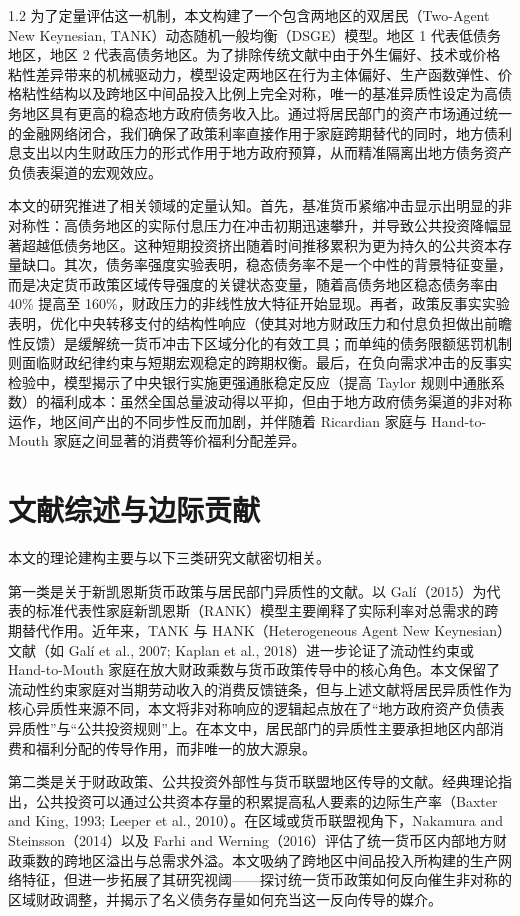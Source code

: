 \documentclass[12pt,UTF8]{ctexart}
\begin{document}
\begin{spacing}{1.2}
		为了定量评估这一机制，本文构建了一个包含两地区的双居民（Two-Agent New Keynesian, TANK）动态随机一般均衡（DSGE）模型。地区 1 代表低债务地区，地区 2 代表高债务地区。为了排除传统文献中由于外生偏好、技术或价格粘性差异带来的机械驱动力，模型设定两地区在行为主体偏好、生产函数弹性、价格粘性结构以及跨地区中间品投入比例上完全对称，唯一的基准异质性设定为高债务地区具有更高的稳态地方政府债务收入比。通过将居民部门的资产市场通过统一的金融网络闭合，我们确保了政策利率直接作用于家庭跨期替代的同时，地方债利息支出以内生财政压力的形式作用于地方政府预算，从而精准隔离出地方债务资产负债表渠道的宏观效应。
		
		本文的研究推进了相关领域的定量认知。首先，基准货币紧缩冲击显示出明显的非对称性：高债务地区的实际付息压力在冲击初期迅速攀升，并导致公共投资降幅显著超越低债务地区。这种短期投资挤出随着时间推移累积为更为持久的公共资本存量缺口。其次，债务率强度实验表明，稳态债务率不是一个中性的背景特征变量，而是决定货币政策区域传导强度的关键状态变量，随着高债务地区稳态债务率由 40\% 提高至 160\%，财政压力的非线性放大特征开始显现。再者，政策反事实实验表明，优化中央转移支付的结构性响应（使其对地方财政压力和付息负担做出前瞻性反馈）是缓解统一货币冲击下区域分化的有效工具；而单纯的债务限额惩罚机制则面临财政纪律约束与短期宏观稳定的跨期权衡。最后，在负向需求冲击的反事实检验中，模型揭示了中央银行实施更强通胀稳定反应（提高 Taylor 规则中通胀系数）的福利成本：虽然全国总量波动得以平抑，但由于地方政府债务渠道的非对称运作，地区间产出的不同步性反而加剧，并伴随着 Ricardian 家庭与 Hand-to-Mouth 家庭之间显著的消费等价福利分配差异。
		
		\section{文献综述与边际贡献}
		
		本文的理论建构主要与以下三类研究文献密切相关。
		
		第一类是关于新凯恩斯货币政策与居民部门异质性的文献。以 Galí（2015）为代表的标准代表性家庭新凯恩斯（RANK）模型主要阐释了实际利率对总需求的跨期替代作用。近年来，TANK 与 HANK（Heterogeneous Agent New Keynesian）文献（如 Galí et al., 2007; Kaplan et al., 2018）进一步论证了流动性约束或 Hand-to-Mouth 家庭在放大财政乘数与货币政策传导中的核心角色。本文保留了流动性约束家庭对当期劳动收入的消费反馈链条，但与上述文献将居民异质性作为核心异质性来源不同，本文将非对称响应的逻辑起点放在了“地方政府资产负债表异质性”与“公共投资规则”上。在本文中，居民部门的异质性主要承担地区内部消费和福利分配的传导作用，而非唯一的放大源泉。
		
		第二类是关于财政政策、公共投资外部性与货币联盟地区传导的文献。经典理论指出，公共投资可以通过公共资本存量的积累提高私人要素的边际生产率（Baxter and King, 1993; Leeper et al., 2010）。在区域或货币联盟视角下，Nakamura and Steinsson（2014）以及 Farhi and Werning（2016）评估了统一货币区内部地方财政乘数的跨地区溢出与总需求外溢。本文吸纳了跨地区中间品投入所构建的生产网络特征，但进一步拓展了其研究视阈——探讨统一货币政策如何反向催生非对称的区域财政调整，并揭示了名义债务存量如何充当这一反向传导的媒介。
		

\end{spacing}
\end{document}
